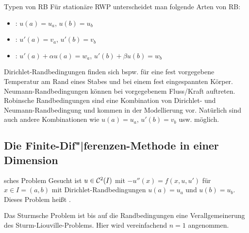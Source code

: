 \linie

\begin{Def}{Typen von RB}
    Für stationäre RWP unterscheidet man folgende Arten von RB:
    \begin{itemize}
        \item
        :
        $u(a) = u_a$, $u(b) = u_b$

        \item
        :
        $u'(a) = v_a$, $u'(b) = v_b$

        \item
        :
        $u'(a) + \alpha u(a) = w_a$, $u'(b) + \beta u(b) = w_b$
    \end{itemize}
\end{Def}

\begin{Bsp}
    Dirichlet-Randbedingungen finden sich bspw. für eine fest vorgegebene
    Temperatur am Rand eines Stabes und bei einem fest eingespannten Körper.
    Neumann-Randbedingungen können bei vorgegebenem Fluss/Kraft auftreten.
    Robinsche Randbedingungen sind eine Kombination von Dirichlet- und
    Neumann-Randbedin\-gung und kommen in der Modellierung vor.
    Natürlich sind auch andere Kombinationen wie
    $u(a) = u_a$, $u'(b) = v_b$ usw. möglich.
\end{Bsp}

\pagebreak

\subsection{%
    Die Finite-Dif"|ferenzen-Methode in einer Dimension%
}

\begin{Def}{sches Problem}
    Gesucht ist $u \in \mathcal{C}^2(I)$ mit $-u''(x) = f(x, u, u')$ für
    $x \in I = (a, b)$ mit Dirichlet-Randbedingungen
    $u(a) = u_a$ und $u(b) = u_b$.\\
    Dieses Problem heißt .
\end{Def}

\begin{Bem}
    Das Sturmsche Problem ist bis auf die Randbedingungen eine
    Verallgemeinerung des Sturm-Liouville-Problems.
    Hier wird vereinfachend $n = 1$ angenommen.
\end{Bem}

\linie

